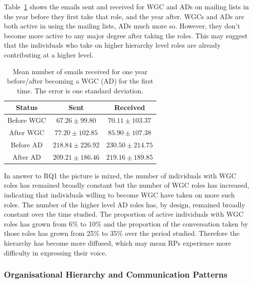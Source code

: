 \documentclass[twocolumn,10pt]{article}
\newcommand{\pb}[1]{\vspace{0.75ex}\noindent{\textbf{#1}}}
\begin{document}
Table~\ref{tab:WGC_email} shows the emails sent and received for WGC and
ADs on mailing lists in the year before they first take that role, and the
year after. WGCs and ADs are both active in using the mailing lists, ADs
much more so. However, they don't become more active to any major degree
after taking the roles. This may suggest that the individuals who take on
higher hierarchy level roles are already contributing at a higher level.

\begin{table}[!tbp]
\centering
    \begin{tabular}{c||c|c}
        Status & Sent & Received \\
         \hline \hline 
        Before WGC & $67.26\pm99.80$ & $70.11\pm103.37$ \\
        \hline
        After WGC & $77.20\pm102.85$ & $85.90\pm107.38$ \\
        \hline
        Before AD & $218.84\pm226.92$ & $230.50\pm214.75$ \\
        \hline
        After AD & $209.21\pm186.46$ & $219.16\pm189.85$ \\
    \end{tabular}
        \caption{Mean number of emails received for one year before/after becoming a WGC (AD) for the first time. The error is one standard deviation.}
    \label{tab:WGC_email}
\end{table}

\pb{Summary}
In answer to RQ1 the picture is mixed, the number of individuals with WGC
roles has remained broadly constant but the number of WGC roles has
increased, indicating that individuals willing to become WGC have taken on
more such roles. The number of the higher level AD roles has, by design,
remained broadly constant over the time studied. The proportion of active
individuals with WGC roles has grown from 6\% to 10\% and the proportion of
the conversation taken by those roles has grown from 25\% to 35\% over the
period studied. Therefore the hierarchy has become more diffused, which may
mean RPs experience more difficulty in expressing their voice.


\subsubsection{Organisational Hierarchy and Communication Patterns}
\label{sec:org-dyn:hierarchy:rq2}
\end{document}
